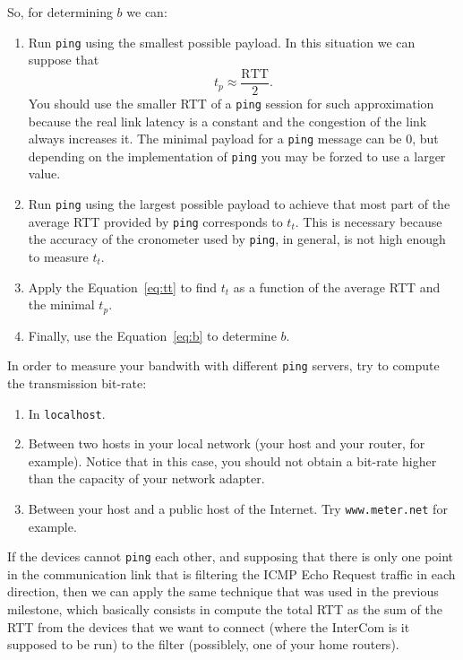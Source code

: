 So, for determining $b$ we can:
\begin{enumerate}
\item Run \texttt{ping} using the smallest possible payload. In this
  situation we can suppose that
  \begin{equation}
    t_p \approx \frac{\text{RTT}}{2}.
    \label{eq:tp}
  \end{equation}
  You should use the smaller RTT of a \texttt{ping} session for such
  approximation because the real link latency is a constant and the
  congestion of the link always increases it. The minimal payload for
  a \texttt{ping} message can be 0, but depending on the
  implementation of \texttt{ping} you may be forzed to use a larger
  value.
\item Run \texttt{ping} using the largest possible payload to achieve
  that most part of the average RTT provided by \texttt{ping}
  corresponds to $t_t$. This is necessary because the accuracy of the
  cronometer used by \texttt{ping}, in general, is not high enough to
  measure $t_t$.
\item Apply the Equation~\ref{eq:tt} to find $t_t$ as a function of
  the average RTT and the minimal $t_p$.
\item Finally, use the Equation~\ref{eq:b} to determine $b$.
\end{enumerate}

In order to measure your bandwith with different \texttt{ping}
servers, try to compute the transmission bit-rate:
\begin{enumerate}
\item In \texttt{localhost}.
\item Between two hosts in your local network (your host and your
  router, for example). Notice that in this case, you should not
  obtain a bit-rate higher than the capacity of your network adapter.
\item Between your host and a public host of the Internet. Try
  \texttt{www.meter.net} for example.
\end{enumerate}

If the devices cannot \texttt{ping} each other, and supposing that
there is only one point in the communication link that is filtering
the ICMP Echo Request traffic in each direction, then we can apply the
same technique that was used in the previous milestone, which
basically consists in compute the total RTT as the sum of the RTT from
the devices that we want to connect (where the InterCom is it supposed
to be run) to the filter (possiblely, one of your home routers).

